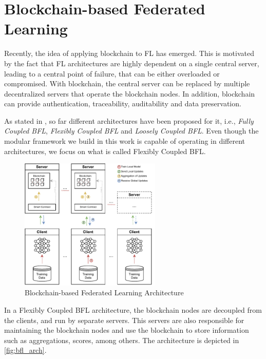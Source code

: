 \section{Blockchain-based Federated Learning}\label{background:bfl}

Recently, the idea of applying blockchain to FL has emerged. This is motivated by the fact that FL architectures are highly dependent on a single central server, leading to a central point of failure, that can be either overloaded or compromised. With blockchain, the central server can be replaced by multiple decentralized servers that operate the blockchain nodes. In addition, blockchain can provide authentication, traceability, auditability and data preservation.

As stated in \cite{10.48550/arxiv.2110.02182}, so far different architectures have been proposed for it, i.e., \textit{Fully Coupled BFL}, \textit{Flexibly Coupled BFL} and \textit{Loosely Coupled BFL}. Even though the modular framework we build in this work is capable of operating in different architectures, we focus on what is called Flexibly Coupled BFL.

\begin{figure}[!ht]
    \centering
    \centering
    \includegraphics[width=0.6\textwidth]{graphics/bfl-architecture.pdf}
    \caption{Blockchain-based Federated Learning Architecture}
    \label{fig:bfl_arch}
\end{figure}

In a Flexibly Coupled BFL architecture, the blockchain nodes are decoupled from the clients, and run by separate servers. This servers are also responsible for maintaining the blockchain nodes and use the blockchain to store information such as aggregations, scores, among others. The architecture is depicted in \autoref{fig:bfl_arch}.


